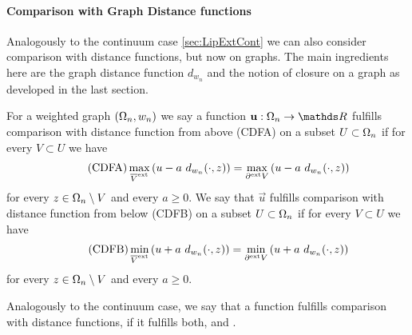 \paragraph{Comparison with Graph Distance functions}
%
Analogously to the continuum case \cref{sec:LipExtCont} we can also consider comparison with distance functions, but now on graphs. The main ingredients here are the graph distance function $d_{w_n}$ and the notion of closure on a graph as developed in the last section.
%
%
\begin{definition}{}{}
For a weighted graph $(\Omega_n,w_n)$ we say a function $\vec u:\domain_n\to\R$ fulfills comparison with distance function from above (CDFA) on a subset $U\subset \Omega_n$ if for every $V\subset U$ we have
%
\begin{align}\label{eq:CDFA}\tag{CDFA}
\max_{\overline{V}^{\text{ext}}} \left(u - a\ d_{w_n}(\cdot, z)\right)=
\max_{\partial^{\text{ext}} V} \left(u - a\ d_{w_n}(\cdot, z)\right)
\end{align}
%
for every $z\in \Omega_n\setminus V$ and every $a\geq 0$. We say that $\vec u$ fulfills comparison with distance function from below (CDFB) on a subset $U\subset \Omega_n$ if for every $V\subset U$ we have
%
\begin{align}\label{eq:CDFB}\tag{CDFB}
\min_{\overline{V}^{\text{ext}}} \left(u + a\ d_{w_n}(\cdot, z)\right)=
\min_{\partial^{\text{ext}} V} \left(u + a\ d_{w_n}(\cdot, z)\right)
\end{align}
%
for every $z\in \Omega_n\setminus V$ and every $a\geq 0$.
\end{definition}
%
%
\noindent%
Analogously to the continuum case, we say that a function fulfills comparison with distance functions, if it fulfills both,  and . 
%
%
%
